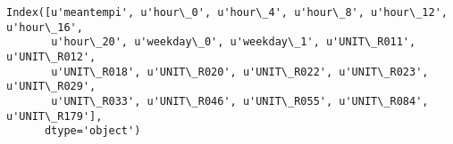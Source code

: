 \documentclass{article}
\begin{document}
    \begin{Verbatim}[commandchars=\\\{\}]
Index([u'meantempi', u'hour\_0', u'hour\_4', u'hour\_8', u'hour\_12', u'hour\_16',
       u'hour\_20', u'weekday\_0', u'weekday\_1', u'UNIT\_R011', u'UNIT\_R012',
       u'UNIT\_R018', u'UNIT\_R020', u'UNIT\_R022', u'UNIT\_R023', u'UNIT\_R029',
       u'UNIT\_R033', u'UNIT\_R046', u'UNIT\_R055', u'UNIT\_R084', u'UNIT\_R179'],
      dtype='object')
    \end{Verbatim}


    
    
    
    
\end{document}
